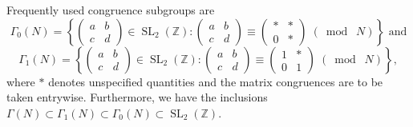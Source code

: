 \documentclass[10pt,leqno]{article}
\theoremstyle{plain}
\theoremstyle{definition}
\numberwithin{equation}{section}
\numberwithin{lem}{section}
\newcommand{\cbr}[1]{\left\{#1\right\}}
\DeclareMathOperator{\SL}{SL}
\newcommand{\smod}[1]{\;(\bmod\; #1)}
\begin{document}
Frequently used congruence subgroups are 
\[\varGamma_0(N) = \cbr{\begin{pmatrix}
    a & b \\ c & d
\end{pmatrix}\in\SL_2(\mathbb{Z}): \begin{pmatrix}
    a & b \\ c & d
\end{pmatrix}\equiv\begin{pmatrix}
    \ast & \ast \\ 0 & \ast
\end{pmatrix}\smod N}\text{ and}\]
\[\varGamma_1(N) = \cbr{\begin{pmatrix}
    a & b \\ c & d
\end{pmatrix}\in \SL_2(\mathbb{Z}): \begin{pmatrix}
    a & b \\ c & d 
\end{pmatrix}\equiv \begin{pmatrix}
    1 & \ast \\ 0 & 1
\end{pmatrix}\smod N},\] where $\ast$ denotes unspecified quantities and the matrix congruences are to be taken entrywise. Furthermore, we have the inclusions $\varGamma(N)\subset\varGamma_1(N)\subset\varGamma_0(N)\subset\SL_2(\mathbb{Z})$.
\end{document}
